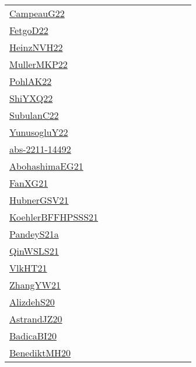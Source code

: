 {\begin{longtable}{p{3cm}p{4cm}p{2cm}p{2cm}p{2cm}p{2cm}p{2cm}p{2cm}p{2cm}p{2cm}}
\href{articles/CampeauG22.pdf}{CampeauG22}~\cite{CampeauG22} &  &  &  &  &  &  &  &  & \\
\href{articles/FetgoD22.pdf}{FetgoD22}~\cite{FetgoD22} &  &  &  &  &  &  &  &  & \\
\href{articles/HeinzNVH22.pdf}{HeinzNVH22}~\cite{HeinzNVH22} &  &  &  &  &  &  &  &  & \\
\href{articles/MullerMKP22.pdf}{MullerMKP22}~\cite{MullerMKP22} &  &  &  &  &  &  &  &  & \\
\href{articles/PohlAK22.pdf}{PohlAK22}~\cite{PohlAK22} &  &  &  &  &  &  &  &  & \\
\href{}{ShiYXQ22}~\cite{ShiYXQ22} &  &  &  &  &  &  &  &  & \\
\href{articles/SubulanC22.pdf}{SubulanC22}~\cite{SubulanC22} &  &  &  &  &  &  &  &  & \\
\href{}{YunusogluY22}~\cite{YunusogluY22} &  &  &  &  &  &  &  &  & \\
\href{articles/abs-2211-14492.pdf}{abs-2211-14492}~\cite{abs-2211-14492} &  &  &  &  &  &  &  &  & \\
\href{articles/AbohashimaEG21.pdf}{AbohashimaEG21}~\cite{AbohashimaEG21} &  &  &  &  &  &  &  &  & \\
\href{articles/FanXG21.pdf}{FanXG21}~\cite{FanXG21} &  &  &  &  &  &  &  &  & \\
\href{articles/HubnerGSV21.pdf}{HubnerGSV21}~\cite{HubnerGSV21} &  &  &  &  &  &  &  &  & \\
\href{articles/KoehlerBFFHPSSS21.pdf}{KoehlerBFFHPSSS21}~\cite{KoehlerBFFHPSSS21} &  &  &  &  &  &  &  &  & \\
\href{articles/PandeyS21a.pdf}{PandeyS21a}~\cite{PandeyS21a} &  &  &  &  &  &  &  &  & \\
\href{articles/QinWSLS21.pdf}{QinWSLS21}~\cite{QinWSLS21} &  &  &  &  &  &  &  &  & \\
\href{articles/VlkHT21.pdf}{VlkHT21}~\cite{VlkHT21} &  &  &  &  &  &  &  &  & \\
\href{articles/ZhangYW21.pdf}{ZhangYW21}~\cite{ZhangYW21} &  &  &  &  &  &  &  &  & \\
\href{}{AlizdehS20}~\cite{AlizdehS20} &  &  &  &  &  &  &  &  & \\
\href{articles/AstrandJZ20.pdf}{AstrandJZ20}~\cite{AstrandJZ20} &  &  &  &  &  &  &  &  & \\
\href{}{BadicaBI20}~\cite{BadicaBI20} &  &  &  &  &  &  &  &  & \\
\href{articles/BenediktMH20.pdf}{BenediktMH20}~\cite{BenediktMH20} &  &  &  &  &  &  &  &  & \\

\end{longtable}}
